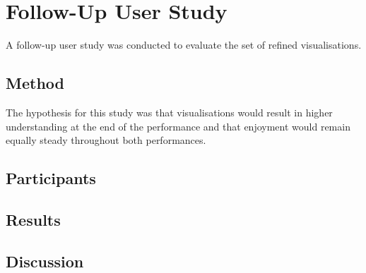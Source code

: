
\chapter{Follow-Up User Study}
\label{chap:follow-up-user-study}

A follow-up user study was conducted to evaluate the set of refined visualisations.

\section{Method}

The hypothesis for this study was that visualisations would result in higher understanding at the end of the performance and that enjoyment would remain equally steady throughout both performances.

\section{Participants}

\section{Results}

\section{Discussion}

